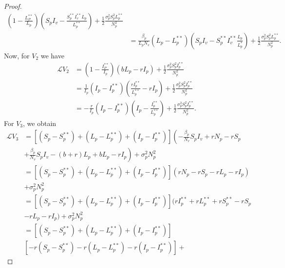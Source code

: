 \begin{proof}
\begin{align*}
				\left(
					1 - 
					\frac{L_P^{**}}{L_p}
				\right)
				\left(S_pI_v - 
					\frac{S_p^{**}I_v^{**}L_p}{L_p^{**}}
				\right) + 
				\frac{1}{2}
				\frac{\sigma_p^2S_p^2L_p^{**}}{N_p^2}
			\\
			&=
				\frac{\beta_p}{L_pN_v}
				\left(
					L_p - L_p^{**}
				\right)
				\left(
					S_pI_v - S_p ^{**} I_v^{**}
					\frac{L_p}{L_p^*}
				\right) + 
				\frac{1}{2}
				\frac{\sigma_p^2 S_p^2 L_p^{**}}{N_p^2}.
	\end{align*}
%
Now, for $V_2$ we have
%
	\begin{align*}
		\mathcal{L}V_2 
			&= 
				\left(
					1 - 
					\frac{I_P^{**}}{I_p}
				\right)
				\left(
					bL_p - r I_p 
				\right) + 
				\frac{1}{2}
				\frac{\sigma_p^2 S_p^2 I_p^{**}}{N_p^2}
			\\
			&= 
				\frac{1}{I_p}
				(I_p-I_p^{**})
				\left(
					\frac{rI_p^{**}}{L_p^{**}} - 
					rI_p
				\right) + 
				\frac{1}{2}
				\frac{\sigma_p^2 S_p^2 I_p^{**}}{N_p^2}
			\\
			&=
				-\frac{r}{I_p} (I_p - I_p ^{**})
				\left(I_p - \frac{I_p ^{**}}{L_p^{**}}
				\right) + 
				\frac{1}{2} 
				\frac{\sigma_p^2 S_p^2 I_p ^{**}}{N_p^2}.
	\end{align*}
	For $V_3$, we obtain
	\begin{align*}
		\mathcal{L}V_3
			&= 
				\left[
					(S_p - S_p ^{**} ) + 
					(L_p - L_p ^{**}) +
					(I_p - I_p ^{**})
				\right]
				\left(
					-\frac{\beta_p}{N_v}S_pI_v + 
					r N_p - rS_p 
				\right.\\
			&+
				\left.
					\frac{\beta_p}{N_v} 
					S_pI_v - (b+r)L_p + bL_p-rI_p
				\right) + 
				\sigma_p^2N_p^2
				\\
			&= 
				\left[
					(S_p - S_p^{**}) + 
					(L_p - L_p^{**}) + 
					(I_p - I_p^{**})
				\right]
				( r N_p - r S_p - r L_p - r I_p)
			\\
				& +
				\sigma_p^2N_p^2
			\\
			&=
				\left[
					(S_p - S_p ^{**}) + 
					(L_p - L_p ^{**}) + 
					(I_p - I_p^{**})
				\right]
				( r I_p ^{**} + r L_p^{**} + rS_p^{**} - rS_p 
				\\
				&-
				r L_p-r I_p)
				+ \sigma_p^2 N_p^2
			\\
			&=
				\left[
					(S_p - S_p ^{**}) + 
					(L_p - L_p ^{**}) +
					(I_p - I_p ^{**})
				\right]
				\\
				&\left[
					-r (S_p - S_p ^{**}) -
					r (L_p - L_p^{**}) 
					-r(I_p-I_p^{**})
				\right]
			+ 

\end{align*}
\end{proof}

